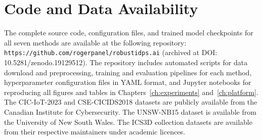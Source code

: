 \section{Code and Data Availability}
\label{app:availability}

The complete source code, configuration files, and trained model checkpoints for all seven methods are available at the following repository: \texttt{https://github.com/rogerpanel/robustidps.ai} (archived at DOI: 10.5281/zenodo.19129512). The repository includes automated scripts for data download and preprocessing, training and evaluation pipelines for each method, hyperparameter configuration files in YAML format, and Jupyter notebooks for reproducing all figures and tables in Chapters~\ref{ch:experiments} and~\ref{ch:platform}. The CIC-IoT-2023 and CSE-CICIDS2018 datasets are publicly available from the Canadian Institute for Cybersecurity. The UNSW-NB15 dataset is available from the University of New South Wales. The ICS3D collection datasets are available from their respective maintainers under academic licences.
